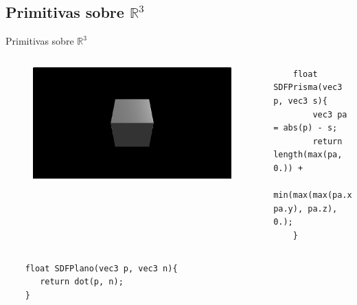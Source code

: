 \subsection{Primitivas sobre \(\mathbb{R}^3\)}
\begin{frame}[fragile]{Primitivas sobre \(\mathbb{R}^3\)}

    \begin{columns}[c, onlytextwidth]
        \column{1.5in}
            \begin{figure}[H]
              \centering
              \includegraphics[width=1.0\textwidth]{imagenes/sdf/3d/sdf_prisma_rect.png}
            \end{figure}
        
        \column{\dimexpr\paperwidth-10pt}
        
            \begin{lstlisting}
    float SDFPrisma(vec3 p, vec3 s){
        vec3 pa = abs(p) - s;
        return length(max(pa, 0.)) +
        min(max(max(pa.x, pa.y), pa.z), 0.);
    }
            \end{lstlisting}
        
    \end{columns}
    
    \begin{columns}[c, onlytextwidth]
        \column{\dimexpr\paperwidth-140pt}
            \begin{lstlisting}
    float SDFPlano(vec3 p, vec3 n){
       return dot(p, n);
    }
            \end{lstlisting}
    

\end{columns}
\end{frame}
